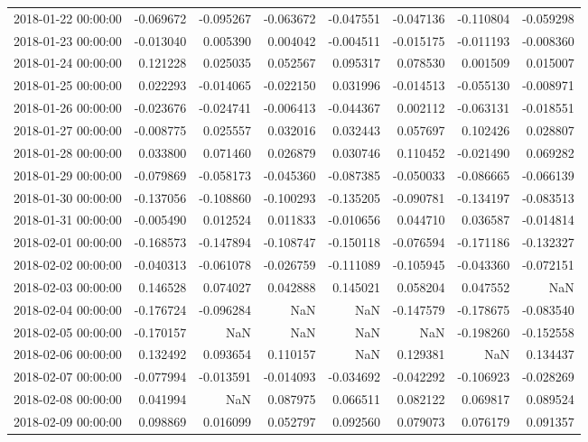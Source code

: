 \begin{tabular}{lrrrrrrr}
2018-01-22 00:00:00 & -0.069672 & -0.095267 & -0.063672 & -0.047551 & -0.047136 & -0.110804 & -0.059298 \\
2018-01-23 00:00:00 & -0.013040 & 0.005390 & 0.004042 & -0.004511 & -0.015175 & -0.011193 & -0.008360 \\
2018-01-24 00:00:00 & 0.121228 & 0.025035 & 0.052567 & 0.095317 & 0.078530 & 0.001509 & 0.015007 \\
2018-01-25 00:00:00 & 0.022293 & -0.014065 & -0.022150 & 0.031996 & -0.014513 & -0.055130 & -0.008971 \\
2018-01-26 00:00:00 & -0.023676 & -0.024741 & -0.006413 & -0.044367 & 0.002112 & -0.063131 & -0.018551 \\
2018-01-27 00:00:00 & -0.008775 & 0.025557 & 0.032016 & 0.032443 & 0.057697 & 0.102426 & 0.028807 \\
2018-01-28 00:00:00 & 0.033800 & 0.071460 & 0.026879 & 0.030746 & 0.110452 & -0.021490 & 0.069282 \\
2018-01-29 00:00:00 & -0.079869 & -0.058173 & -0.045360 & -0.087385 & -0.050033 & -0.086665 & -0.066139 \\
2018-01-30 00:00:00 & -0.137056 & -0.108860 & -0.100293 & -0.135205 & -0.090781 & -0.134197 & -0.083513 \\
2018-01-31 00:00:00 & -0.005490 & 0.012524 & 0.011833 & -0.010656 & 0.044710 & 0.036587 & -0.014814 \\
2018-02-01 00:00:00 & -0.168573 & -0.147894 & -0.108747 & -0.150118 & -0.076594 & -0.171186 & -0.132327 \\
2018-02-02 00:00:00 & -0.040313 & -0.061078 & -0.026759 & -0.111089 & -0.105945 & -0.043360 & -0.072151 \\
2018-02-03 00:00:00 & 0.146528 & 0.074027 & 0.042888 & 0.145021 & 0.058204 & 0.047552 & NaN \\
2018-02-04 00:00:00 & -0.176724 & -0.096284 & NaN & NaN & -0.147579 & -0.178675 & -0.083540 \\
2018-02-05 00:00:00 & -0.170157 & NaN & NaN & NaN & NaN & -0.198260 & -0.152558 \\
2018-02-06 00:00:00 & 0.132492 & 0.093654 & 0.110157 & NaN & 0.129381 & NaN & 0.134437 \\
2018-02-07 00:00:00 & -0.077994 & -0.013591 & -0.014093 & -0.034692 & -0.042292 & -0.106923 & -0.028269 \\
2018-02-08 00:00:00 & 0.041994 & NaN & 0.087975 & 0.066511 & 0.082122 & 0.069817 & 0.089524 \\
2018-02-09 00:00:00 & 0.098869 & 0.016099 & 0.052797 & 0.092560 & 0.079073 & 0.076179 & 0.091357 \\

\end{tabular}
